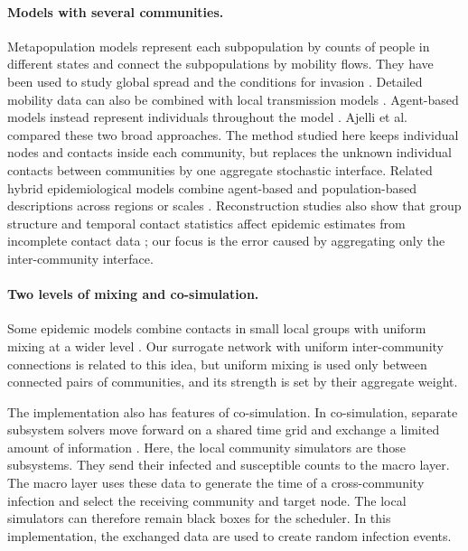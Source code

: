 \documentclass{ieeeaccess}
\newcommand{\michael}[2]{{\color{RoyalBlue}#1}}
\begin{document}
\paragraph{Models with several communities.}
Metapopulation models represent each subpopulation by counts of people in different states and connect the subpopulations by mobility flows. They have been used to study global spread and the conditions for invasion \cite{colizza2007reaction,colizza2008,balcan2009,balcan2010modeling}. Detailed mobility data can also be combined with local transmission models \cite{chang2021}. Agent-based models instead represent individuals throughout the model \cite{eubank2004,kerr2021}. Ajelli et al.~\cite{ajelli2010} compared these two broad approaches. \michael{The method studied here keeps individual nodes and contacts inside each community, but replaces the unknown individual contacts between communities by one aggregate stochastic interface. Related hybrid epidemiological models combine agent-based and population-based descriptions across regions or scales \cite{bicker2025}. Reconstruction studies also show that group structure and temporal contact statistics affect epidemic estimates from incomplete contact data \cite{genois2015sampling}; our focus is the error caused by aggregating only the inter-community interface.}{The method studied here keeps individual nodes and contacts inside each community, but replaces the unknown individual contacts between communities by one aggregate stochastic interface.}

\paragraph{Two levels of mixing and co-simulation.}
Some epidemic models combine contacts in small local groups with uniform mixing at a wider level \cite{ball1997}. Our surrogate network with uniform inter-community connections is related to this idea, but uniform mixing is used only between connected pairs of communities, and its strength is set by their aggregate weight.

The implementation also has features of co-simulation. In co-simulation, separate subsystem solvers move forward on a shared time grid and exchange a limited amount of information \cite{gomes2018cosim}. Here, the local community simulators are those subsystems. They send their infected and susceptible counts to the macro layer. The macro layer uses these data to generate the time of a cross-community infection and select the receiving community and target node. The local simulators can therefore remain black boxes for the scheduler. In this implementation, the exchanged data are used to create random infection events.
\end{document}
